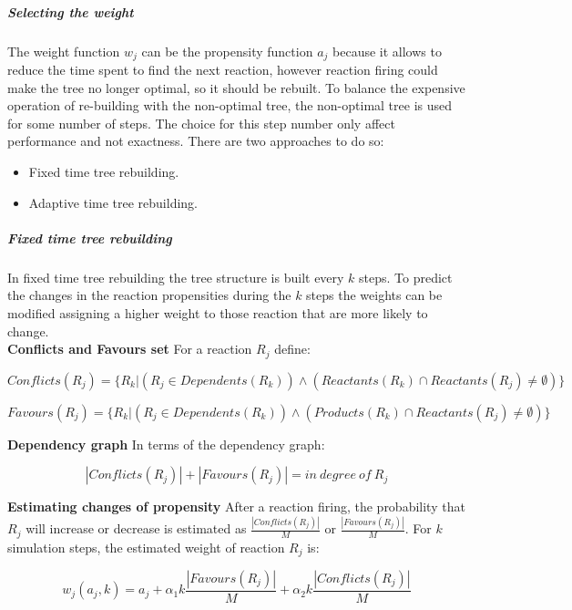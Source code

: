         \subparagraph{Selecting the weight}
        The weight function $w_j$ can be the propensity function $a_j$ because it allows to reduce the time spent to find the next reaction, however reaction firing could make the tree no longer optimal, so it should be rebuilt.
        To balance the expensive operation of re-building with the non-optimal tree, the non-optimal tree is used for some number of steps.
        The choice for this step number only affect performance and not exactness.
        There are two approaches to do so:

        \begin{multicols}{2}
          \begin{itemize}
            \item Fixed time tree rebuilding.
            \item Adaptive time tree rebuilding.
          \end{itemize}
        \end{multicols}

        \subparagraph{Fixed time tree rebuilding}
        In fixed time tree rebuilding the tree structure is built every $k$ steps.
        To predict the changes in the reaction propensities during the $k$ steps the weights can be modified assigning a higher weight to those reaction that are more likely to change.\\

          \textbf{Conflicts and Favours set}
          For a reaction $R_j$ define:

          $$Conflicts(R_j) = \{R_k|(R_j\in Dependents(R_k))\land(Reactants(R_k)\cap Reactants(R_j)\neq\emptyset)\}$$

          $$Favours(R_j) = \{R_k|(R_j\in Dependents(R_k))\land (Products(R_k)\cap Reactants(R_j)\neq\emptyset)\}$$

          \textbf{Dependency graph}
          In terms of the dependency graph:

          $$|Conflicts(R_j)| + |Favours(R_j)| = in\ degree\ of\ R_j$$

          \textbf{Estimating changes of propensity}
          After a reaction firing, the probability that $R_j$ will increase or decrease is estimated as $\frac{|Conflicts(R_j)|}{M}$ or $\frac{|Favours(R_j)|}{M}$.
          For $k$ simulation steps, the estimated weight of reaction $R_j$ is:

          $$w_j(a_j, k) = a_j + \alpha_1 k\frac{|Favours(R_j)|}{M} + \alpha_2 k\frac{|Conflicts(R_j)|}{M}$$

